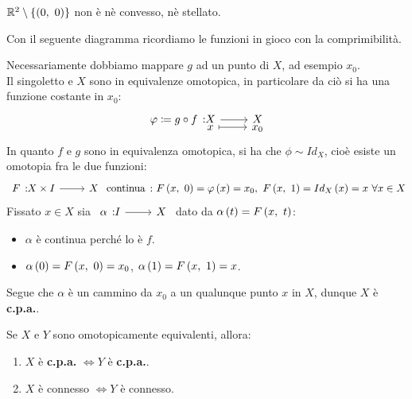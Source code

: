 \begin{example}
$\realset^2\setminus\left\{\left(0,\ 0\right)\right\}$ non è nè convesso, nè stellato.
\end{example}
\begin{lemming}
\end{lemming}
\begin{demonstration} Con il seguente diagramma ricordiamo le funzioni in gioco con la comprimibilità.
\begin{center}
\end{center}
Necessariamente dobbiamo mappare $g$ ad un punto di $X$, ad esempio $x_0$.  \\
Il singoletto e $X$ sono in equivalenze omotopica, in particolare da ciò si ha una funzione costante in $x_0$:
\begin{equation*}
	\funztot{\phi\coloneqq g\circ f}{X}{X}{x}{x_0}
\end{equation*}
In quanto $f$ e $g$ sono in equivalenza omotopica, si ha che $\phi\sim Id_X$, cioè esiste un omotopia fra le due funzioni:
\begin{equation*}
	\funz{F}{X\times I}{X}\text{ continua}\ \colon \mvf{F}{x}{0}=\phi\left(x\right)=x_0,\ \mvf{F}{x}{1}=Id_X\left(x\right)=x\ \forall x\in X
\end{equation*}
Fissato $x\in X$ sia $\funz{\alpha}{I}{X}$ dato da $\alpha\left(t\right)=F\left(x,\ t\right)$:
\begin{itemize}
	\item $\alpha$ è continua perché lo è $f$.
	\item $\alpha\left(0\right)=F\left(x,\ 0\right)=x_0$, $\alpha\left(1\right)=F\left(x,\ 1\right)=x$.
\end{itemize}
Segue che $\alpha$ è un cammino da $x_0$ a un qualunque punto $x$ in $X$, dunque $X$ è \textbf{c.p.a.}.
\end{demonstration}
\begin{exercise}
Se $X$ e $Y$ sono omotopicamente equivalenti, allora:
\begin{enumerate}
\item $X$ è \textbf{c.p.a.} $\iff Y$ è \textbf{c.p.a.}.
\item $X$ è connesso $\iff Y$ è connesso.
\end{enumerate}
\vspace{-3mm}
\end{exercise}
